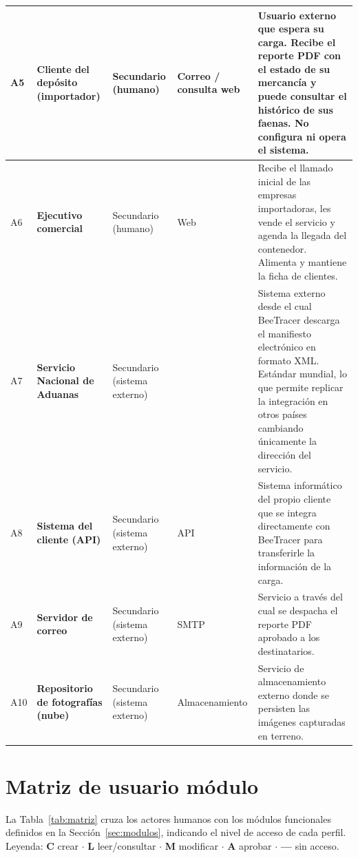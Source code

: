{\begin{longtable}{L{0.04\textwidth} L{0.17\textwidth} L{0.13\textwidth} L{0.13\textwidth} L{0.44\textwidth}}
\midrule

A5 & \textbf{Cliente del depósito} (importador) & Secundario (humano) & Correo / consulta web &
Usuario externo que espera su carga. Recibe el reporte PDF con el estado de su mercancía y puede
consultar el histórico de sus faenas. No configura ni opera el sistema. \\

\midrule

A6 & \textbf{Ejecutivo comercial} & Secundario (humano) & Web &
Recibe el llamado inicial de las empresas importadoras, les vende el servicio y agenda la llegada
del contenedor. Alimenta y mantiene la ficha de clientes. \\

\midrule

A7 & \textbf{Servicio Nacional de Aduanas} & Secundario (sistema externo) &  &
Sistema externo desde el cual BeeTracer descarga el manifiesto electrónico en formato XML. Estándar
mundial, lo que permite replicar la integración en otros países cambiando únicamente la dirección
del servicio. \\

\midrule

A8 & \textbf{Sistema del cliente (API)} & Secundario (sistema externo) & API &
Sistema informático del propio cliente que se integra directamente con BeeTracer para transferirle
la información de la carga. \\

\midrule

A9 & \textbf{Servidor de correo} & Secundario (sistema externo) & SMTP &
Servicio a través del cual se despacha el reporte PDF aprobado a los destinatarios. \\

\midrule

A10 & \textbf{Repositorio de fotografías (nube)} & Secundario (sistema externo) & Almacenamiento &
Servicio de almacenamiento externo donde se persisten las imágenes capturadas en terreno. \\

\bottomrule

\end{longtable}
}

\section{Matriz de usuario \texttimes{} módulo}
\label{sec:matriz}

La Tabla~\ref{tab:matriz} cruza los actores humanos con los módulos funcionales definidos en la
Sección~\ref{sec:modulos}, indicando el nivel de acceso de cada perfil. Leyenda: \textbf{C} crear
$\cdot$ \textbf{L} leer/consultar $\cdot$ \textbf{M} modificar $\cdot$ \textbf{A} aprobar $\cdot$
\textbf{---} sin acceso.

